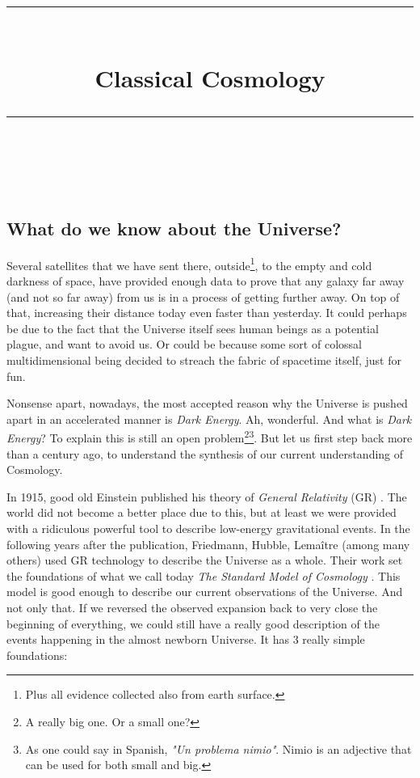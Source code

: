 \documentclass[11pt, a4paper]{article} %
\title{	
	\normalfont\normalsize
	\textsc{}\\ %
	\vspace{5pt} %
	\rule{\linewidth}{0.2pt}\\ %
	\vspace{10pt} %
	{\huge Classical Cosmology}\\ %
	\vspace{5pt} %
	\rule{\linewidth}{-2pt}\\ %
	\vspace{-25pt} %
	\date{}
}
\author{}
\begin{document}
\maketitle 




	  \subsection*{What do we know about the Universe?}

Several satellites that we have sent there, outside\footnote{Plus all evidence collected also from earth surface.}, to the empty and cold darkness of space, have provided enough data to prove that any galaxy far away (and not so far away) from us is in a process of getting further away. On top of that, increasing their distance today even faster than yesterday. It could perhaps be due to the fact that the Universe itself sees human beings as a potential plague, and want to avoid us. Or could be because some sort of colossal multidimensional being decided to streach the fabric of spacetime itself, just for fun.

Nonsense apart, nowadays, the most accepted reason why the Universe is pushed apart in an accelerated manner is \textit{Dark Energy}. Ah, wonderful. And what is \textit{Dark Energy}? To explain this is still an open problem\footnote{A really big one. Or a small one?}\footnote{As one could say in Spanish, \textit{"Un problema nimio"}. Nimio is an adjective that can be used for both small and big.}. But let us first step back more than a century ago, to understand the synthesis of our current understanding of Cosmology.


In 1915, good old Einstein published his theory of \textit{General Relativity} (GR) \cite{}. The world did not become a better place due to this, but at least we were provided with a ridiculous powerful tool to describe low-energy gravitational events. In the following years after the publication, Friedmann, Hubble, Lema\^itre \cite{} (among many others) used GR technology to describe the Universe as a whole. Their work set the foundations of what we call today \textit{The Standard Model of Cosmology} \cite{}. This model is good enough to describe our current observations of the Universe. And not only that. If we reversed the observed expansion back to very close the beginning of everything, we could still have a really good description of the events happening in the almost newborn Universe. It has 3 really simple foundations:
\end{document}
